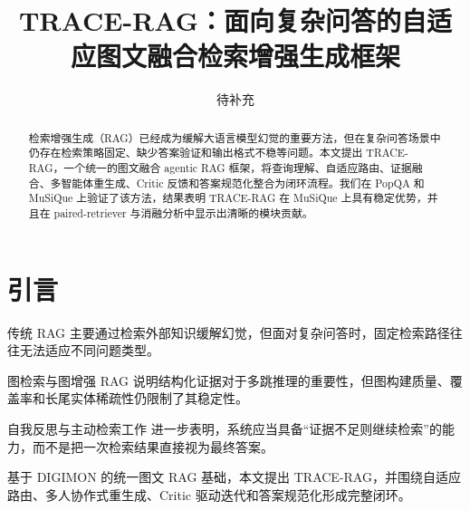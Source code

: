 ﻿\documentclass[UTF8,11pt,twocolumn]{ctexart}
\title{TRACE-RAG：面向复杂问答的自适应图文融合检索增强生成框架}
\author{待补充}
\date{}
\begin{document}
\maketitle

\begin{abstract}
检索增强生成（RAG）已经成为缓解大语言模型幻觉的重要方法，但在复杂问答场景中仍存在检索策略固定、缺少答案验证和输出格式不稳等问题。本文提出 TRACE-RAG，一个统一的图文融合 agentic RAG 框架，将查询理解、自适应路由、证据融合、多智能体重生成、Critic 反馈和答案规范化整合为闭环流程。我们在 PopQA 和 MuSiQue 上验证了该方法，结果表明 TRACE-RAG 在 MuSiQue 上具有稳定优势，并且在 paired-retriever 与消融分析中显示出清晰的模块贡献。
\end{abstract}

%

\section{引言}
传统 RAG \cite{rag2020,robertson2009probabilistic,karpukhin2020dpr} 主要通过检索外部知识缓解幻觉，但面对复杂问答时，固定检索路径往往无法适应不同问题类型。

图检索与图增强 RAG \cite{jimenez2024hipporag,hu2024grag,shen2024gear,yao2023tot,sarthi2024raptor} 说明结构化证据对于多跳推理的重要性，但图构建质量、覆盖率和长尾实体稀疏性仍限制了其稳定性。

自我反思与主动检索工作 \cite{asai2023selfrag,jiang2023flare} 进一步表明，系统应当具备“证据不足则继续检索”的能力，而不是把一次检索结果直接视为最终答案。

基于 DIGIMON 的统一图文 RAG 基础，本文提出 TRACE-RAG，并围绕自适应路由、多人协作式重生成、Critic 驱动迭代和答案规范化形成完整闭环。
\end{document}
